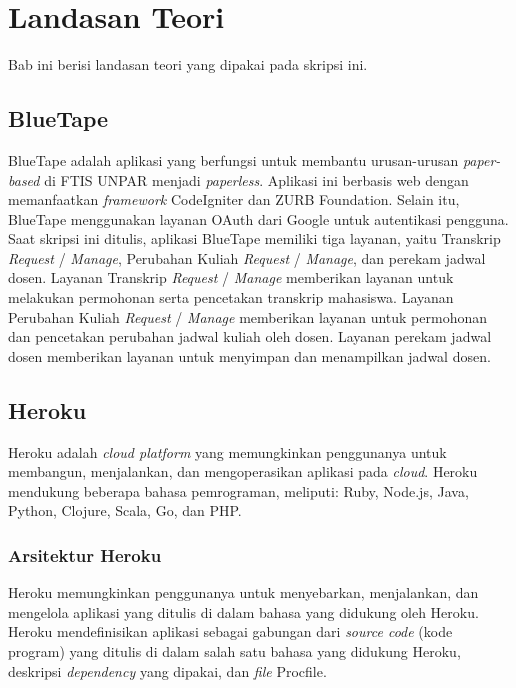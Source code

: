 
\chapter{Landasan Teori}
\label{chap:teori}
\setcounter{secnumdepth}{3}
Bab ini berisi landasan teori yang dipakai pada skripsi ini.

\section{BlueTape}
\label{sec:BlueTape}
BlueTape adalah aplikasi yang berfungsi untuk membantu urusan-urusan \textit{paper-based} di FTIS UNPAR menjadi \textit{paperless}. Aplikasi ini berbasis web dengan memanfaatkan \textit{framework} CodeIgniter dan ZURB Foundation. Selain itu, BlueTape menggunakan layanan OAuth dari Google untuk autentikasi pengguna. Saat skripsi ini ditulis, aplikasi BlueTape memiliki tiga layanan, yaitu Transkrip \textit{Request} / \textit{Manage}, Perubahan Kuliah \textit{Request} / \textit{Manage}, dan perekam jadwal dosen. Layanan Transkrip \textit{Request} / \textit{Manage} memberikan layanan untuk melakukan permohonan serta pencetakan transkrip mahasiswa. Layanan Perubahan Kuliah \textit{Request} / \textit{Manage} memberikan layanan untuk permohonan dan pencetakan perubahan jadwal kuliah oleh dosen. Layanan perekam jadwal dosen memberikan layanan untuk menyimpan dan menampilkan jadwal dosen. \footnotemark
{}


\section{Heroku ~\cite{heroku}}
\label{sec:Heroku}
Heroku adalah \textit{cloud platform} yang memungkinkan penggunanya untuk membangun, menjalankan, dan mengoperasikan aplikasi pada \textit{cloud}. Heroku mendukung beberapa bahasa pemrograman, meliputi: Ruby, Node.js, Java, Python, Clojure, Scala, Go, dan PHP.

\subsection{Arsitektur Heroku}
Heroku memungkinkan penggunanya untuk menyebarkan, menjalankan, dan mengelola aplikasi yang ditulis di dalam bahasa yang didukung oleh Heroku. Heroku mendefinisikan aplikasi sebagai gabungan dari \textit{source code} (kode program) yang ditulis di dalam salah satu bahasa yang didukung Heroku, deskripsi \textit{dependency} yang dipakai, dan \textit{file} Procfile. 

